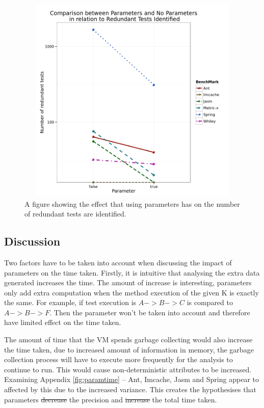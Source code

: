 \documentclass[11pt
              , a4paper
              , twoside
              , openright
              ]{report}
\providecommand{\DIFadd}[1]{{\protect\color{blue}\uwave{#1}}} %
\providecommand{\DIFdel}[1]{{\protect\color{red}\sout{#1}}}                      %
\providecommand{\DIFaddbegin}{} %
\providecommand{\DIFaddend}{} %
\providecommand{\DIFdelbegin}{} %
\providecommand{\DIFdelend}{} %
\begin{document}
\begin{figure}[H]
\begin{center}
\includegraphics[height=10cm, width = 14.5cm]{Parameters.png}
\end{center}
\caption{A figure showing the effect that using parameters has on the number of redundant tests are identified.}
\label{fig:paramgraph}
\end{figure}

\subsection{Discussion}
Two factors have to be taken into account when discussing the impact of parameters on the time taken. Firstly, it is intuitive that analysing the extra data generated increases the time. The amount of increase is interesting, parameters only add extra computation when the method execution of the given K is exactly the same. For example, if test execution is $A ->  B ->  C$ is compared to $A ->  B ->  F$. Then the parameter won't be taken into account and therefore have limited effect on the time taken. 

The amount of time that the VM spends garbage collecting would also increase the time taken, due to increased amount of information in memory, the garbage collection process will have to execute more frequently for the analysis to continue to run. This would cause non-deterministic attributes to be increased. Examining Appendix \ref{fig:paramtime} -- Ant, Imcache, Jasm and Spring appear to affected by this due to the increased variance. This creates the hypothesises that parameters \DIFdelbegin \DIFdel{decrease }\DIFdelend \DIFaddbegin \DIFadd{increase }\DIFaddend the precision and \DIFdelbegin \DIFdel{increase }\DIFdelend the total time taken. 
\end{document}

